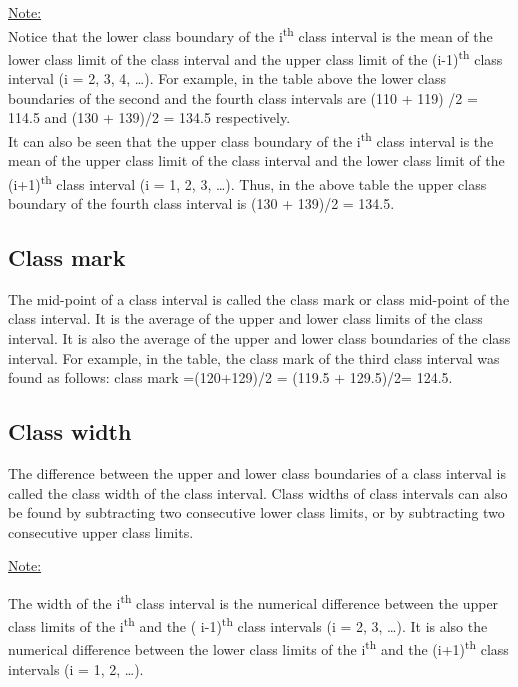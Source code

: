 \documentclass[
]{book}
\begin{document}
\ul{Note:}\\
Notice that the lower class boundary of the i\textsuperscript{th} class interval is the
mean of the lower class limit of the class interval and the upper class
limit of the (i-1)\textsuperscript{th} class interval (i = 2, 3, 4, \ldots). For example,
in the table above the lower class boundaries of the second and the
fourth class intervals are (110 + 119) /2 = 114.5 and (130 + 139)/2 =
134.5 respectively.\\
It can also be seen that the upper class boundary of the i\textsuperscript{th} class
interval is the mean of the upper class limit of the class interval and
the lower class limit of the (i+1)\textsuperscript{th} class interval (i = 1, 2, 3,
\ldots). Thus, in the above table the upper class boundary of the fourth
class interval is (130 + 139)/2 = 134.5.

\subsection{Class mark}\label{class-mark}

The mid-point of a class interval is called the class mark or class
mid-point of the class interval. It is the average of the upper and
lower class limits of the class interval. It is also the average of the
upper and lower class boundaries of the class interval. For example, in
the table, the class mark of the third class interval was found as
follows: class mark =(120+129)/2 = (119.5 + 129.5)/2= 124.5.

\subsection{Class width}\label{class-width}

The difference between the upper and lower class boundaries of a class
interval is called the class width of the class interval. Class widths
of class intervals can also be found by subtracting two consecutive
lower class limits, or by subtracting two consecutive upper class
limits.

\ul{Note:}

The width of the i\textsuperscript{th} class interval is the numerical difference
between the upper class limits of the i\textsuperscript{th} and the ( i-1)\textsuperscript{th} class
intervals (i = 2, 3, \ldots). It is also the numerical difference between
the lower class limits of the i\textsuperscript{th} and the (i+1)\textsuperscript{th} class intervals (i
= 1, 2, \ldots).
\end{document}

